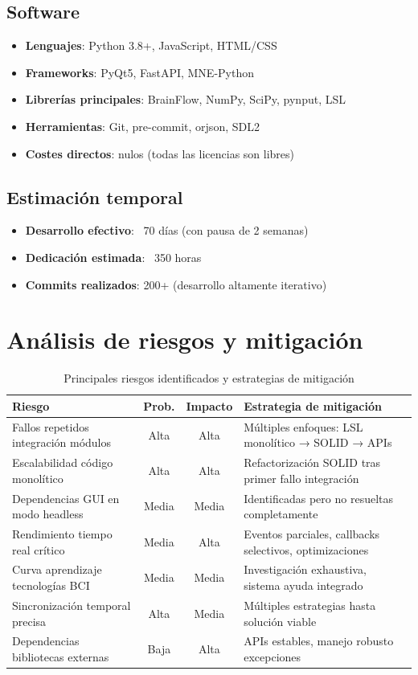 \subsection{Software}
\begin{itemize}
    \item \textbf{Lenguajes}: Python 3.8+, JavaScript, HTML/CSS
    \item \textbf{Frameworks}: PyQt5, FastAPI, MNE-Python
    \item \textbf{Librerías principales}: BrainFlow, NumPy, SciPy, pynput, LSL
    \item \textbf{Herramientas}: Git, pre-commit, orjson, SDL2
    \item \textbf{Costes directos}: nulos (todas las licencias son libres)
\end{itemize}

\subsection{Estimación temporal}
\begin{itemize}
    \item \textbf{Desarrollo efectivo}: ~70 días (con pausa de 2 semanas)
    \item \textbf{Dedicación estimada}: ~350 horas
    \item \textbf{Commits realizados}: 200+ (desarrollo altamente iterativo)
\end{itemize}

\section{Análisis de riesgos y mitigación}

\begin{table}[hp!]
  \centering
  \begin{tabular}{l|c|c|l}
  \rowcolor{udcpink!25}
  \textbf{Riesgo} & \textbf{Prob.} & \textbf{Impacto} & \textbf{Estrategia de mitigación} \\
  \hline
  Fallos repetidos integración módulos & Alta & Alta & Múltiples enfoques: LSL monolítico → SOLID → APIs \\
  Escalabilidad código monolítico & Alta & Alta & Refactorización SOLID tras primer fallo integración \\
  Dependencias GUI en modo headless & Media & Media & Identificadas pero no resueltas completamente \\
  Rendimiento tiempo real crítico & Media & Alta & Eventos parciales, callbacks selectivos, optimizaciones \\
  Curva aprendizaje tecnologías BCI & Media & Media & Investigación exhaustiva, sistema ayuda integrado \\
  Sincronización temporal precisa & Alta & Media & Múltiples estrategias hasta solución viable \\
  Dependencias bibliotecas externas & Baja & Alta & APIs estables, manejo robusto excepciones \\
  \end{tabular}
  \caption{Principales riesgos identificados y estrategias de mitigación}
  \label{tab:riesgos}
\end{table}

